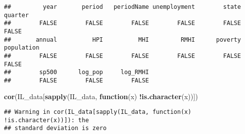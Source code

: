 \documentclass[
]{article}
\newenvironment{Shaded}{\begin{snugshade}}{\end{snugshade}}
\newcommand{\ControlFlowTok}[1]{\textcolor[rgb]{0.13,0.29,0.53}{\textbf{#1}}}
\newcommand{\KeywordTok}[1]{\textcolor[rgb]{0.13,0.29,0.53}{\textbf{#1}}}
\newcommand{\NormalTok}[1]{#1}
\newcommand{\OperatorTok}[1]{\textcolor[rgb]{0.81,0.36,0.00}{\textbf{#1}}}
\begin{document}
\begin{verbatim}
##         year       period   periodName unemployment        state      quarter 
##        FALSE        FALSE        FALSE        FALSE        FALSE        FALSE 
##       annual          HPI          MHI         RMHI      poverty   population 
##        FALSE        FALSE        FALSE        FALSE        FALSE        FALSE 
##        sp500      log_pop     log_RMHI 
##        FALSE        FALSE        FALSE
\end{verbatim}

\begin{Shaded}
\begin{Highlighting}[]
\KeywordTok{cor}\NormalTok{(IL_data[}\KeywordTok{sapply}\NormalTok{(IL_data, }\ControlFlowTok{function}\NormalTok{(x) }\OperatorTok{!}\KeywordTok{is.character}\NormalTok{(x))])}
\end{Highlighting}
\end{Shaded}

\begin{verbatim}
## Warning in cor(IL_data[sapply(IL_data, function(x) !is.character(x))]): the
## standard deviation is zero
\end{verbatim}
\end{document}
